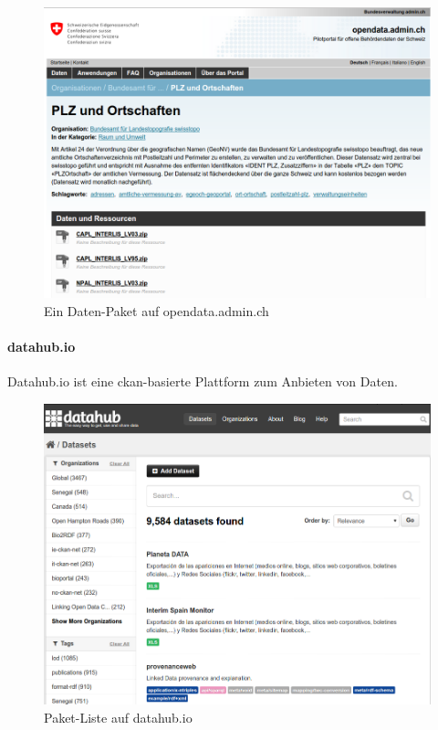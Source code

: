 \begin{figure}[H]
    \centering
    \includegraphics[width=2\linewidth/3]{fig/opendata-admin-ch}
    \caption{Ein Daten-Paket auf opendata.admin.ch}
\end{figure}

\paragraph{datahub.io}
Datahub.io ist eine \gls{ckan}-basierte Plattform zum Anbieten von Daten.

\begin{figure}[H]
    \centering
    \includegraphics[width=2\linewidth/3]{fig/datahub-io}
    \caption{Paket-Liste auf datahub.io}
\end{figure}


